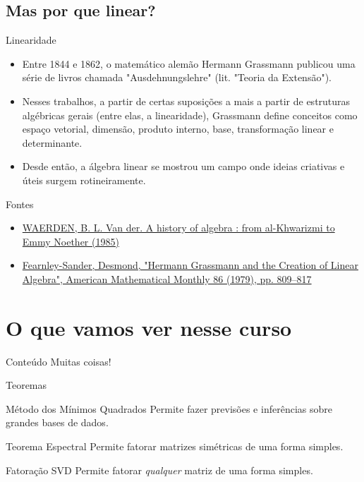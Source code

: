 \documentclass[article]{beamer}%
\begin{document}
\subsection{Mas por que linear?}
\begin{frame}{Linearidade}

\begin{itemize}[<+->]
    \item Entre 1844 e 1862, o matemático alemão Hermann Grassmann publicou uma série de livros chamada "Ausdehnungslehre" (lit. "Teoria da Extensão").

    \item Nesses trabalhos, a partir de certas suposições a mais a partir de estruturas algébricas gerais (entre elas, a linearidade), Grassmann define conceitos como espaço vetorial, dimensão, produto interno, base, transformação linear e determinante.

    \item Desde então, a álgebra linear se mostrou um campo onde ideias criativas e úteis surgem rotineiramente.
\end{itemize}
    
\end{frame}


\begin{frame}{Fontes}

\begin{itemize}
    \item \href{https://sb.fgv.br/catalogo/index.asp?codigo_sophia=226637
}{WAERDEN, B. L. Van der. A history of algebra : from al-Khwarizmi to Emmy Noether (1985)}

    \item \href{https://www.jstor.org/stable/pdf/2320145.pdf}{Fearnley-Sander, Desmond, "Hermann Grassmann and the Creation of Linear Algebra", American Mathematical Monthly 86 (1979), pp. 809–817}
\end{itemize}
    
\end{frame}

\section{O que vamos ver nesse curso}

\begin{frame}{Conteúdo}
    \pause
    \centering Muitas coisas!
\end{frame}

\begin{frame}{Teoremas}
    \begin{block}{Método dos Mínimos Quadrados}
    Permite fazer previsões e inferências sobre grandes bases de dados.
\end{block}\pause

\begin{block}{Teorema Espectral}
    Permite fatorar matrizes simétricas de uma forma simples.
\end{block}\pause

\begin{block}{Fatoração SVD}
    Permite fatorar \emph{qualquer} matriz de uma forma simples.
\end{block}
\end{frame}
\end{document}
